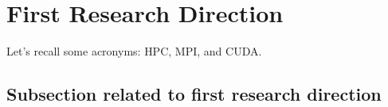 
\section{First Research Direction}
\label{sec-first}

\lipsum[2-4]

Let's recall some acronyms: \gls{HPC}, \gls{MPI}, and \gls{CUDA}.

\subsection{Subsection related to first research direction}

\lipsum[1-1]
